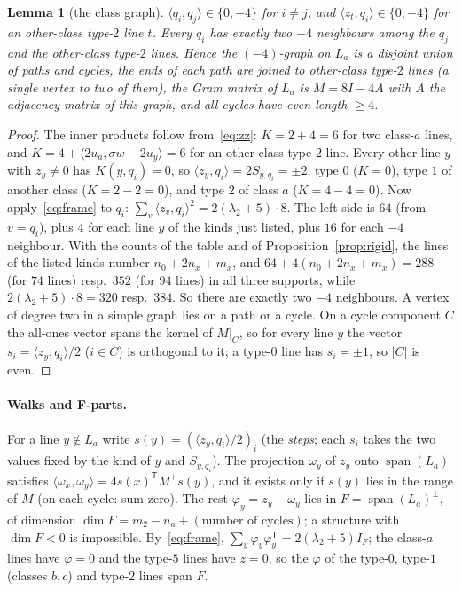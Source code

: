 \documentclass[11pt]{article}
\newtheorem{lemma}[theorem]{Lemma}
\theoremstyle{definition}
\begin{document}
\begin{lemma}[the class graph]\label{lem:classgraph}
$\langle q_i,q_j\rangle\in\{0,-4\}$ for $i\ne j$, and $\langle z_t,q_i\rangle\in\{0,-4\}$ for an other-class
type-$2$ line $t$. Every $q_i$ has exactly two $-4$ neighbours among the $q_j$ and the other-class
type-$2$ lines. Hence the $(-4)$-graph on $L_a$ is a disjoint union of paths and cycles, the ends of each
path are joined to other-class type-$2$ lines (a single vertex to two of them), the Gram matrix of $L_a$
is $M=8I-4A$ with $A$ the adjacency matrix of this graph, and all cycles have even length $\ge4$.
\end{lemma}
\begin{proof}
The inner products follow from~\eqref{eq:zz}: $K=2+4=6$ for two class-$a$ lines, and
$K=4+\langle2u_a,\sigma w-2u_y\rangle=6$ for an other-class type-$2$ line. Every other line $y$ with $z_y\ne0$
has $K(y,q_i)=0$, so $\langle z_y,q_i\rangle=2S_{y,q_i}=\pm2$: type $0$ ($K=0$), type $1$ of another class
($K=2-2=0$), and type $2$ of class $a$ ($K=4-4=0$). Now apply~\eqref{eq:frame} to $q_i$:
$\sum_v\langle z_v,q_i\rangle^2=2(\lambda_2+5)\cdot8$. The left side is $64$ (from $v=q_i$), plus $4$ for each
line $y$ of the kinds just listed, plus $16$ for each $-4$ neighbour. With the counts of the table and
of Proposition~\ref{prop:rigid}, the lines of the listed kinds number $n_0+2n_x+m_x$, and
$64+4(n_0+2n_x+m_x)=288$ (for $74$ lines) resp.\ $352$ (for $94$ lines) in all three supports, while
$2(\lambda_2+5)\cdot8=320$ resp.\ $384$. So there are exactly two $-4$ neighbours. A vertex of degree two
in a simple graph lies on a path or a cycle. On a cycle component $C$ the all-ones vector spans the kernel
of $M|_C$, so for every line $y$ the vector $s_i=\langle z_y,q_i\rangle/2$ ($i\in C$) is orthogonal to it;
a type-$0$ line has $s_i=\pm1$, so $|C|$ is even.
\end{proof}

\paragraph{Walks and F-parts.} For a line $y\notin L_a$ write $s(y)=(\langle z_y,q_i\rangle/2)_i$ (the
\emph{steps}; each $s_i$ takes the two values fixed by the kind of $y$ and $S_{y,q_i}$). The projection
$\omega_y$ of $z_y$ onto $\operatorname{span}(L_a)$ satisfies
$\langle\omega_x,\omega_y\rangle=4s(x)^{\mathsf T}M^+s(y)$, and it exists only if $s(y)$ lies in the range of
$M$ (on each cycle: sum zero). The rest $\varphi_y=z_y-\omega_y$ lies in
$F=\operatorname{span}(L_a)^\perp$, of dimension $\dim F=m_2-n_a+(\text{number of cycles})$; a structure with
$\dim F<0$ is impossible. By~\eqref{eq:frame}, $\sum_y\varphi_y\varphi_y^{\mathsf T}=2(\lambda_2+5)I_F$; the
class-$a$ lines have $\varphi=0$ and the type-$5$ lines have $z=0$, so the $\varphi$ of the type-$0$,
type-$1$ (classes $b,c$) and type-$2$ lines span $F$.
\end{document}
